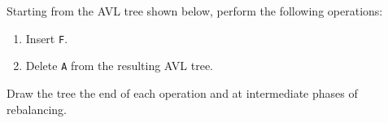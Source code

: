 Starting from the AVL tree shown below, perform the following operations:

\begin{enumerate}

  \item  Insert {\tt F}.

  \item  Delete {\tt A} from the resulting AVL tree.

\end{enumerate}

\noindent  Draw the tree the end of each operation and
at intermediate phases of rebalancing.

\begin{figure}[htb]
\centerline{  }
\end{figure}
